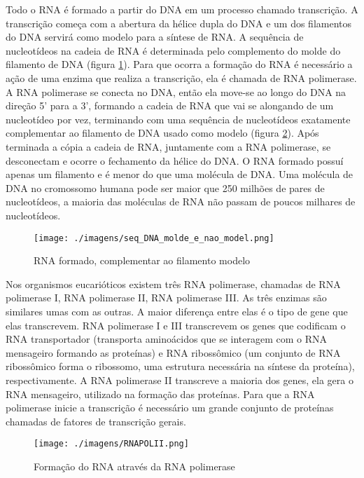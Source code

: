 Todo o RNA é formado a partir do DNA em um processo chamado transcrição. A transcrição começa com a abertura da hélice dupla do DNA e um dos filamentos do DNA servirá como modelo para a síntese de RNA. A sequência de nucleotídeos na cadeia de RNA é determinada pelo complemento do molde do filamento de DNA (figura \ref{fig:seq_DNA_molde_e_nao_model}). Para que ocorra a formação do RNA é necessário a ação de uma enzima que realiza a transcrição, ela é chamada de RNA polimerase. A RNA polimerase se conecta no DNA, então ela move-se ao longo do DNA na direção 5' para a 3', formando a cadeia de RNA que vai se alongando de um nucleotídeo por vez, terminando com uma sequência de nucleotídeos exatamente complementar ao filamento de DNA usado como modelo (figura \ref{fig:RNAPOLII}).  Após terminada a cópia a cadeia de RNA, juntamente com a RNA polimerase, se desconectam e ocorre o fechamento da hélice do DNA. O RNA formado possuí apenas um filamento e é menor do que uma molécula de DNA. Uma molécula de DNA no cromossomo humana pode ser maior que 250 milhões de pares de nucleotídeos, a maioria das moléculas de RNA não passam de poucos milhares de nucleotídeos.

\begin{figure}[htb!]
    \centering
    \texttt{[image: ./imagens/seq\_DNA\_molde\_e\_nao\_model.png]}
    \caption{RNA formado, complementar ao filamento modelo}
    \label{fig:seq_DNA_molde_e_nao_model}
\end{figure}


Nos organismos eucarióticos existem três RNA polimerase, chamadas de RNA polimerase I, RNA polimerase II, RNA polimerase III. As três enzimas são similares umas com as outras. A maior diferença entre elas é o tipo de gene que elas transcrevem. RNA polimerase I e III transcrevem os genes que codificam o RNA transportador (transporta aminoácidos que se interagem com o RNA mensageiro formando as proteínas)  e RNA ribossômico (um conjunto de RNA ribossômico forma o ribossomo, uma estrutura necessária na síntese da proteína), respectivamente. A RNA polimerase II transcreve a maioria dos genes, ela gera o RNA mensageiro, utilizado na formação das proteínas. Para que a RNA polimerase inicie a transcrição é necessário um grande conjunto de proteínas chamadas de fatores de transcrição gerais.

\begin{figure}[htb!]
    \centering
    \texttt{[image: ./imagens/RNAPOLII.png]}
    \caption{Formação do RNA através da RNA polimerase \cite[Adaptada]{Higgs2005}}
    \label{fig:RNAPOLII}
\end{figure}



